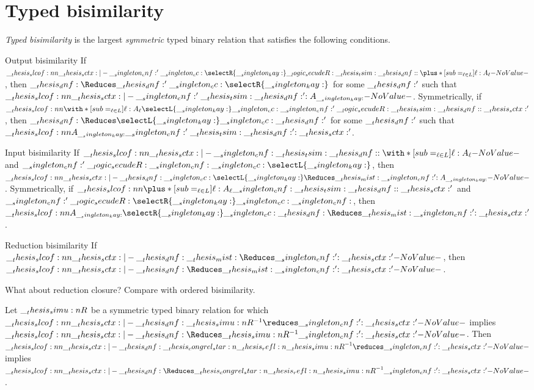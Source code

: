 \chapter{Typed bisimilarity}\label{ch:typed-bisim}

\begin{definition}
  \emph{Typed bisimilarity} is the largest \emph{symmetric} typed binary relation that satisfies the following conditions.
  \begin{thmdescription}
  \item[Output bisimilarity]
    If $\slcof{\sctx |- \cnf' \cc \selectR{\kay} \secudeR\tsim \dnf : \plus*[sub=_{\ell \in L}]{\ell:A_{\ell}}}$, then $\dnf \Reduces \dnf' \cc \selectR{\kay}$ for some $\__thesis_dnf:'$ such that $\slcof{\sctx |- \cnf' \tsim \dnf' : A_{\kay}}$.
    Symmetrically, if $\slcof{\with*[sub=_{\ell \in L}]{\ell:A_{\ell}} |- \selectL{\kay} \cc \cnf' \secudeR\tsim \dnf : \sctx'}$, then $\dnf \Reduces \selectL{\kay} \cc \dnf'$ for some $\__thesis_dnf:'$ such that $\slcof{A_{\kay} |- \cnf' \tsim \dnf' : \sctx'}$.

  \item[Input bisimilarity]
    If $\slcof{\sctx |- \cnf \tsim \dnf : \with*[sub=_{\ell \in L}]{\ell:A_{\ell}}}$ and $\cnf' \secudeR \cnf \cc \selectL{\kay}$, then $\slcof{\sctx |- \dnf \cc \selectL{\kay} \Reduces\mist \cnf' : A_{\kay}}$.
    Symmetrically, if $\slcof{\plus*[sub=_{\ell \in L}]{\ell:A_{\ell}} |- \cnf \tsim \dnf : \sctx'}$ and $\cnf' \secudeR \selectR{\kay} \cc \cnf$, then $\slcof{A_{\kay} |- \selectR{\kay} \cc \dnf \Reduces\mist \cnf' : \sctx'}$.

  \item[Reduction bisimilarity]
    If $\slcof{\sctx |- \dnf \mist\Reduces \cnf' : \sctx'}$, then $\slcof{\sctx |- \dnf \Reduces\mist \cnf' : \sctx'}$.
  \end{thmdescription}
\end{definition}

What about reduction closure?
Compare with ordered bisimilarity.


\begin{lemma}
  Let $\__thesis_simu:n {R}$ be a symmetric typed binary relation for which $\slcof{\sctx |- \dnf \simu{R}^{-1}\reduces \cnf' : \sctx'}$ implies $\slcof{\sctx |- \dnf \Reduces\simu{R}^{-1} \cnf' : \sctx'}$.
  Then $\slcof{\sctx |- \dnf \congrel*{\refl{\simu{R}}}^{-1}\reduces \cnf' : \sctx'}$ implies $\slcof{\sctx |- \dnf \Reduces\congrel*{\refl{\simu{R}}}^{-1} \cnf' : \sctx'}$.
\end{lemma}


